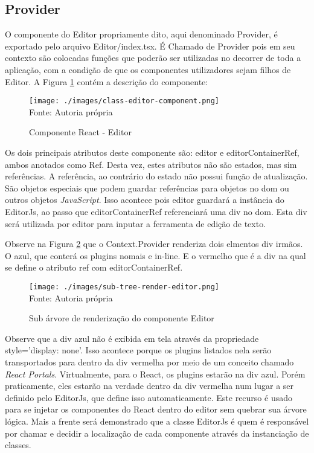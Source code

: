 \subsection{Provider}

O componente do Editor propriamente dito, aqui denominado
Provider, é exportado pelo arquivo Editor/index.tsx. É Chamado de
Provider pois em seu contexto são colocadas funções que poderão ser
utilizadas no decorrer de toda a aplicação, com a condição de que os componentes
utilizadores sejam filhos de Editor.
A
Figura \ref{fig:class-editor-component}
contém a descrição do componente:

\begin{figure}[H]
    \centering
    \caption{Componente React - Editor}
    \texttt{[image: ./images/class-editor-component.png]}
    \label{fig:class-editor-component} \\
    \textnormal{\fontsize{10pt}{12pt}Fonte: Autoria própria}
\end{figure}

Os dois principais atributos deste componente são: editor e editorContainerRef,
ambos anotados como Ref.
Desta vez, estes atributos não são estados, mas sim referências. A referência,
ao contrário do estado não possui função de atualização. São objetos especiais
que podem guardar referências para objetos no
\acrshort{dom}
ou outros objetos \textit{JavaScript}. Isso acontece pois editor guardará a instância
do EditorJs, ao passo que editorContainerRef referenciará uma div no
\acrshort{dom}.
Esta div será utilizada por editor para inputar a ferramenta de edição de
texto.

Observe na
Figura \ref{fig:sub-tree-render-editor}
que o Context.Provider renderiza dois elmentos div irmãos. O azul, que conterá
os plugins nomais e in-line. E o vermelho que é a div na qual se define
o atributo ref com editorContainerRef.

\begin{figure}[H]
    \centering
    \caption{Sub árvore de renderização do componente Editor}
    \texttt{[image: ./images/sub-tree-render-editor.png]}
    \label{fig:sub-tree-render-editor} \\
    \textnormal{\fontsize{10pt}{12pt}Fonte: Autoria própria}
\end{figure}

Observe que a div azul não é exibida em tela através da propriedade
style='display: none'. Isso acontece porque os plugins listados
nela serão transportados para dentro da div vermelha por meio de
um conceito chamado \textit{React Portals}. Virtualmente, para o React,
os plugins estarão na div azul. Porém praticamente, eles estarão na verdade
dentro da div vermelha num lugar a ser definido pelo EditorJs, que define
isso automaticamente. Este recurso é usado para se injetar os componentes
do React dentro do editor sem quebrar sua árvore lógica. Mais a frente
será demonstrado que a classe EditorJs é quem é responsável por chamar
e decidir a localização de cada componente através da
instanciação de classes.

